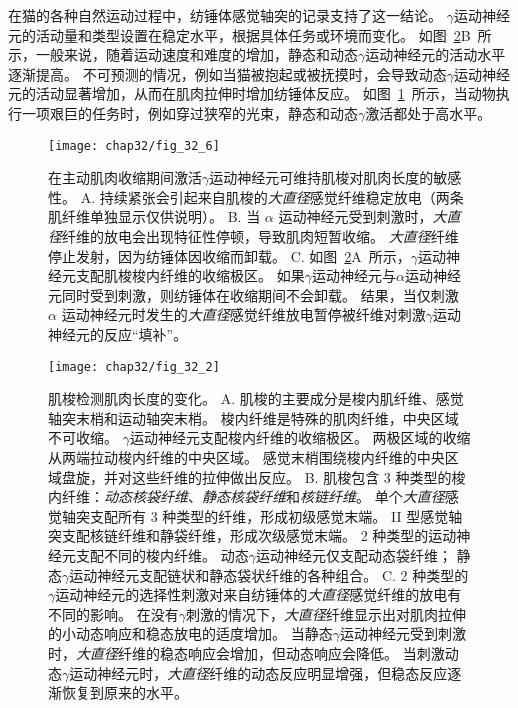 在猫的各种自然运动过程中，纺锤体感觉轴突的记录支持了这一结论。
$ \gamma $运动神经元的活动量和类型设置在稳定水平，根据具体任务或环境而变化。
如图~\ref{fig:32_2}B~所示，一般来说，随着运动速度和难度的增加，静态和动态$ \gamma $运动神经元的活动水平逐渐提高。
不可预测的情况，例如当猫被抱起或被抚摸时，会导致动态$ \gamma $运动神经元的活动显著增加，从而在肌肉拉伸时增加纺锤体反应。 
如图~\ref{fig:32_6}~所示，当动物执行一项艰巨的任务时，例如穿过狭窄的光束，静态和动态$ \gamma $激活都处于高水平。


\begin{figure}[htbp]
	\centering
	\texttt{[image: chap32/fig\_32\_6]}
	\caption{在主动肌肉收缩期间激活$ \gamma $运动神经元可维持肌梭对肌肉长度的敏感性\cite{hunt1951stretch}。 
	A. 持续紧张会引起来自肌梭的\textit{大直径}感觉纤维稳定放电（两条肌纤维单独显示仅供说明）。
	B. 当 $ \alpha $ 运动神经元受到刺激时，\textit{大直径}纤维的放电会出现特征性停顿，导致肌肉短暂收缩。
	\textit{大直径}纤维停止发射，因为纺锤体因收缩而卸载。
	C. 如图~\ref{fig:32_2}A~所示，$ \gamma $运动神经元支配肌梭梭内纤维的收缩极区。
	如果$ \gamma $运动神经元与$ \alpha $运动神经元同时受到刺激，则纺锤体在收缩期间不会卸载。
	结果，当仅刺激 $ \alpha $ 运动神经元时发生的\textit{大直径}感觉纤维放电暂停被纤维对刺激$ \gamma $运动神经元的反应“填补”。}
	\label{fig:32_6}
\end{figure}


\begin{figure}[htbp]
	\centering
	\texttt{[image: chap32/fig\_32\_2]}
	\caption{肌梭检测肌肉长度的变化。
	A. 肌梭的主要成分是梭内肌纤维、感觉轴突末梢和运动轴突末梢。
	梭内纤维是特殊的肌肉纤维，中央区域不可收缩。
	$ \gamma $运动神经元支配梭内纤维的收缩极区。
	两极区域的收缩从两端拉动梭内纤维的中央区域。
	感觉末梢围绕梭内纤维的中央区域盘旋，并对这些纤维的拉伸做出反应\cite{hulliger1984mammalian}。
	B. 肌梭包含 3 种类型的梭内纤维：\textit{动态核袋纤维}、\textit{静态核袋纤维}和\textit{核链纤维}。
	单个\textit{大直径}感觉轴突支配所有 3 种类型的纤维，形成初级感觉末端。
	II 型感觉轴突支配核链纤维和静袋纤维，形成次级感觉末端。
	2 种类型的运动神经元支配不同的梭内纤维。
	动态$ \gamma $运动神经元仅支配动态袋纤维；
	静态$ \gamma $运动神经元支配链状和静态袋状纤维的各种组合\cite{boyd1980isolated}。
	C. 2 种类型的$ \gamma $运动神经元的选择性刺激对来自纺锤体的\textit{大直径}感觉纤维的放电有不同的影响。
	在没有$ \gamma $刺激的情况下，\textit{大直径}纤维显示出对肌肉拉伸的小动态响应和稳态放电的适度增加。
	当静态$ \gamma $运动神经元受到刺激时，\textit{大直径}纤维的稳态响应会增加，但动态响应会降低。
	当刺激动态$\gamma$运动神经元时，\textit{大直径}纤维的动态反应明显增强，但稳态反应逐渐恢复到原来的水平\cite{brown1966subdivision}。}
	\label{fig:32_2}
\end{figure}



